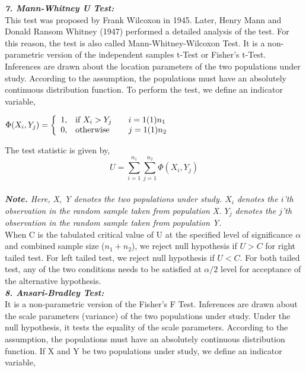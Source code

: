 \documentclass[12pt,a4paper]{report}
\begin{document}
\Large{{\textbf{\textit{7. Mann-Whitney U Test: }}} }\\[10pt]
\Large{This test was proposed by Frank Wilcoxon in 1945. Later, Henry Mann and Donald Ransom Whitney (1947) performed a detailed analysis of the test. For this reason, the test is also called Mann-Whitney-Wilcoxon Test. It is a non-parametric version of the independent samples t-Test or Fisher's t-Test. Inferences are drawn about the location parameters of the two populations under study. According to the assumption, the populations must have an absolutely continuous distribution function. To perform the test, we define an indicator variable,}\\
\begin{center}
\begin{math}
\Phi(X_i,Y_j) = \left\{
\begin{array}{lll}
1, & \mbox{if $X_i>Y_j$} & \mbox{\quad $i = 1(1)n_1$}\\
0, & \mbox{otherwise} & \mbox{\quad $j = 1(1)n_2$}
\end{array}\right.
\end{math}\\[20pt]
\end{center}
\Large{The test statistic is given by,}\\[0.5pt]
\begin{equation}
U = \sum_{i=1}^{n_1} \sum_{j=1}^{n_2} \Phi(X_i,Y_j)
\end{equation}\\
\large{\textit{{\textbf{Note.}} Here, X, Y denotes the two populations under study. $X_i$ denotes the $i$'th observation in the random sample taken from population X. $Y_j$ denotes the $j$'th observation in the random sample taken from population Y.}}\\[10pt]
\Large{When C is the tabulated critical value of U at the specified level of significance $\alpha$ and combined sample size ($n_1 + n_2$), we reject null hypothesis if $U > C$ for right tailed test. For left tailed test, we reject null hypothesis if $U < C$. For both tailed test, any of the two conditions needs to be satisfied at $\alpha/2$ level for acceptance of the alternative hypothesis. }\\[20pt]
\Large{{\textbf{\textit{8. Ansari-Bradley Test: }}} }\\[10pt]
\Large{It is a non-parametric version of the Fisher's F Test. Inferences are drawn about the scale parameters (variance) of the two populations under study. Under the null hypothesis, it tests the equality of the scale parameters. According to the assumption, the populations must have an absolutely continuous distribution function. If X and Y be two populations under study, we define an indicator variable,}\\
\end{document}
